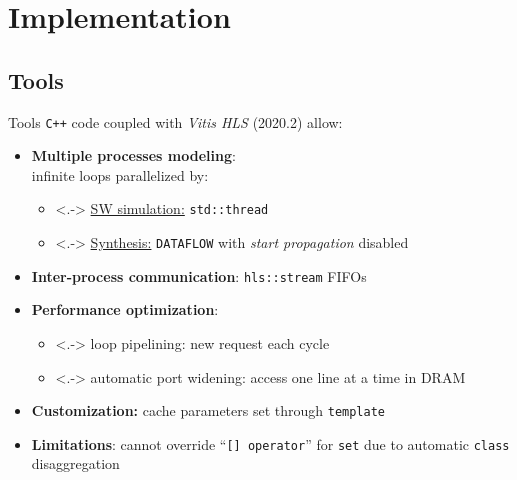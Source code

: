 \documentclass[handout,aspectratio=169]{beamer}
\begin{document}
\section{Implementation}
\subsection{Tools}
\begin{frame}{Tools}
	\texttt{C++} code coupled with \emph{Vitis HLS} (2020.2) allow:
	\pause
	\begin{itemize}[<+->]
		\item \textbf{Multiple processes modeling}:\\
			infinite loops parallelized by:
			\begin{itemize}
				\item<.-> \underline{SW simulation:} \texttt{std::thread}
				\item<.-> \underline{Synthesis:} \texttt{DATAFLOW} with
					\textit{start propagation} disabled
			\end{itemize}
		\item \textbf{Inter-process communication}: \texttt{hls::stream} FIFOs
		\item \textbf{Performance optimization}:
			\begin{itemize}
				\item<.-> loop pipelining: new request each cycle
				\item<.-> automatic port widening: access one line at a time in DRAM
			\end{itemize}
		\item \textbf{Customization:} cache parameters set through \texttt{template}
		\item \textbf{Limitations}: cannot override ``\texttt{[]~operator}''
			for \texttt{set} due to automatic \texttt{class} disaggregation
	\end{itemize}
\end{frame}
\end{document}
